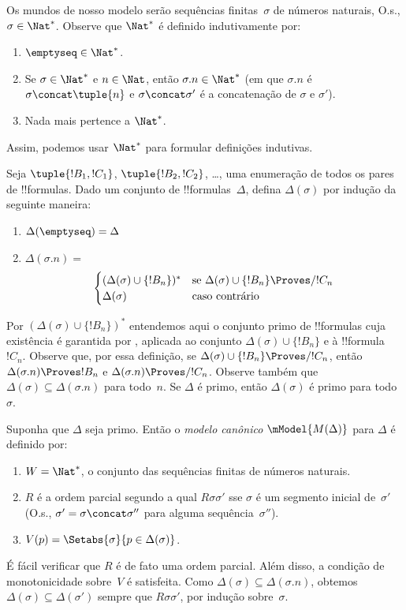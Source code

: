 \documentclass[../../../include/open-logic-section]{subfiles}
\begin{document}


Os mundos de nosso modelo serão sequências finitas~$\sigma$ de números
naturais, O.s.\@, $\sigma \in \Nat^*$. Observe que $\Nat^*$ é definido
indutivamente por:
\begin{enumerate}
\item $\emptyseq \in \Nat^*$.
\item Se $\sigma \in \Nat^*$ e $n \in \Nat$, então $\sigma.n \in
  \Nat^*$ (em que $\sigma.n$ é $\sigma \concat \tuple{n}$ e
  $\sigma \concat \sigma'$ é a concatenação de $\sigma$ e $\sigma'$).
\item Nada mais pertence a $\Nat^*$.
\end{enumerate}
Assim, podemos usar $\Nat^*$ para formular definições indutivas.

Seja $\tuple{!B_1, !C_1}$, $\tuple{!B_2, !C_2}$, \dots, uma
enumeração de todos os pares de !!{formula}s. Dado um conjunto de
!!{formula}s~$\Delta$, defina $\Delta(\sigma)$ por indução da seguinte
maneira:
\begin{enumerate}
\item $\Delta(\emptyseq) = \Delta$
\item $\Delta(\sigma.n) = {}$
  \[
  \begin{cases}
    (\Delta(\sigma) \cup \{!B_n\})^* &
    \text{se $\Delta(\sigma) \cup \{!B_n\} \Proves/ !C_n$} \\
    \Delta(\sigma) & \text{caso contrário}
  \end{cases}
  \]
\end{enumerate}
Por $(\Delta(\sigma) \cup \{!B_n\})^*$ entendemos aqui o conjunto
primo de !!{formula}s cuja existência é garantida por
, aplicada ao conjunto
$\Delta(\sigma) \cup \{!B_n\}$ e à !!{formula}~$!C_n$. Observe que, por
essa definição, se $\Delta(\sigma) \cup \{!B_n\} \Proves/ !C_n$,
então $\Delta(\sigma.n) \Proves !B_n$ e
$\Delta(\sigma.n) \Proves/ !C_n$. Observe também que
$\Delta(\sigma) \subseteq \Delta(\sigma.n)$ para todo~$n$. Se
$\Delta$ é primo, então $\Delta(\sigma)$ é primo para todo~$\sigma$.

\begin{defn}
  Suponha que $\Delta$ seja primo. Então o \emph{modelo canônico}
  $\mModel{M(\Delta)}$ para $\Delta$ é definido por:
  \begin{enumerate}
  \item $W = \Nat^*$, o conjunto das sequências finitas de números naturais.
  \item $R$ é a ordem parcial segundo a qual $R\sigma\sigma'$ sse
    $\sigma$ é um segmento inicial de~$\sigma'$ (O.s.\@,
    $\sigma' = \sigma \concat \sigma''$ para alguma sequência~$\sigma''$).
  \item $V(p) = \Setabs{\sigma}{p \in \Delta(\sigma)}$.
  \end{enumerate}
\end{defn}

É fácil verificar que $R$ é de fato uma ordem parcial. Além disso, a
condição de monotonicidade sobre~$V$ é satisfeita. Como
$\Delta(\sigma) \subseteq \Delta(\sigma.n)$, obtemos
$\Delta(\sigma) \subseteq \Delta(\sigma')$ sempre que
$R\sigma\sigma'$, por indução sobre~$\sigma$.
\end{document}
